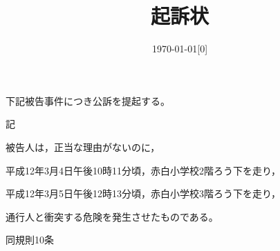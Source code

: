 \documentclass[a4paper,papersize,12pt]{jsarticle}
\begin{document}

\title{起訴状}

\date{\today[0]}



\maketitle[i+++t+++d++r++s]

\sectionZ{}

下記被告事件につき公訴を提起する。

\hfil{記}




被告人は，正当な理由がないのに，

\sectionA*{}平成12年3月4日午後10時11分頃，赤白小学校2階ろう下を走り，

\sectionA*{}平成12年3月5日午後12時13分頃，赤白小学校3階ろう下を走り，

\stateZ\noindent
通行人と衝突する危険を発生させたものである。



同規則10条

\end{document}
